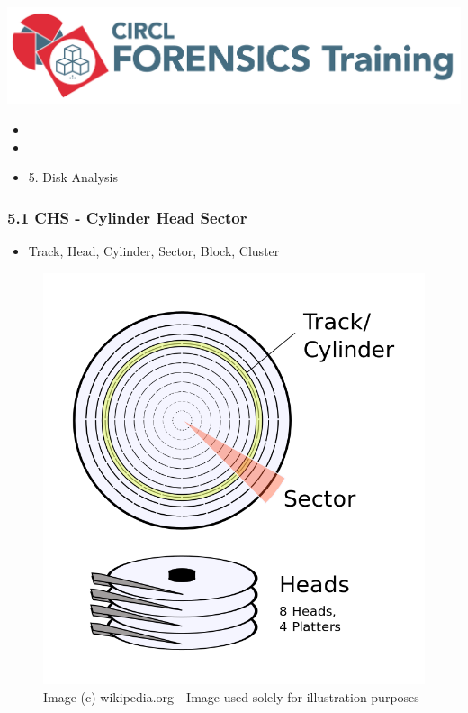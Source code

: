 

\begin{frame}
    \includegraphics[scale=0.3]{images/logo-circl-Forensics.png}
    \begin{itemize}
        \item[]
        \item[]
        \item[] 5. Disk Analysis
    \end{itemize}
\end{frame}


\begin{frame}
  \frametitle{5.1 CHS - Cylinder Head Sector}
    \begin{itemize}
        \item[] Track, Head, Cylinder, Sector, Block, Cluster
    \end{itemize}
    \begin{figure}
        \includegraphics[scale=0.2]{images/chs.png}
        \captionsetup{labelformat=empty,labelsep=none}
        \caption[]{\tiny Image (c) wikipedia.org - Image used solely for illustration purposes}
    \end{figure}
\end{frame}


